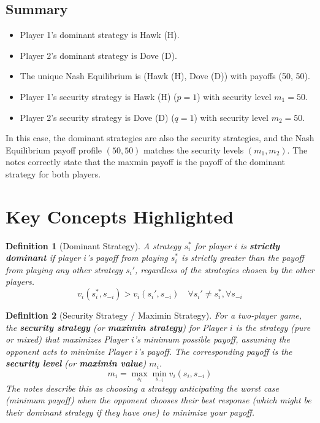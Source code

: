 \documentclass{article}
\newtheorem{definition}{Definition}
\begin{document}
\subsection{Summary}
\begin{itemize}
    \item Player 1's dominant strategy is Hawk (H).
    \item Player 2's dominant strategy is Dove (D).
    \item The unique Nash Equilibrium is (Hawk (H), Dove (D)) with payoffs (50, 50).
    \item Player 1's security strategy is Hawk (H) ($p=1$) with security level $m_1 = 50$.
    \item Player 2's security strategy is Dove (D) ($q=1$) with security level $m_2 = 50$.
\end{itemize}
In this case, the dominant strategies are also the security strategies, and the Nash Equilibrium payoff profile $(50, 50)$ matches the security levels $(m_1, m_2)$. The notes correctly state that the maxmin payoff is the payoff of the dominant strategy for both players.

\section{Key Concepts Highlighted}

\begin{definition}[Dominant Strategy]
A strategy $s_i^*$ for player $i$ is \textbf{strictly dominant} if player $i$'s payoff from playing $s_i^*$ is strictly greater than the payoff from playing any other strategy $s_i'$, regardless of the strategies chosen by the other players.
\[v_i(s_i^*, s_{-i}) > v_i(s_i', s_{-i}) \quad \forall s_i' \neq s_i^*, \forall s_{-i}\]
\end{definition}

\begin{definition}[Security Strategy / Maximin Strategy]
For a two-player game, the \textbf{security strategy} (or \textbf{maximin strategy}) for Player $i$ is the strategy (pure or mixed) that maximizes Player $i$'s minimum possible payoff, assuming the opponent acts to minimize Player $i$'s payoff.
The corresponding payoff is the \textbf{security level} (or \textbf{maximin value}) $m_i$.
\[m_i = \max_{s_i} \min_{s_{-i}} v_i(s_i, s_{-i})\]
The notes describe this as choosing a strategy anticipating the worst case (minimum payoff) when the opponent chooses their best response (which might be their dominant strategy if they have one) to minimize your payoff.
\end{definition}
\end{document}
